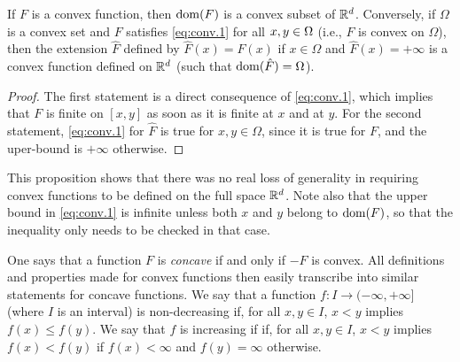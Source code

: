 \begin{proposition}
\label{prop:domain}
If $F$ is a convex function, then $\mathrm{dom}(F)$ is a convex subset of ${\mathbb{R}}^d$. Conversely, if $\Omega$ is a convex set and $F$ satisfies \eqref{eq:conv.1} for all $x,y\in \Omega$ (i.e., $F$ is convex on $\Omega$), then the extension $\hat F$ defined by $\hat F(x) = F(x)$ if $x\in \Omega$ and $\hat F(x) = +\infty$ is a convex function defined on ${\mathbb{R}}^d$ (such that $\mathrm{dom}(\hat F) = \Omega$).
\end{proposition}
\begin{proof} The first statement is a direct consequence of  \cref{eq:conv.1}, which implies that $F$ is finite on $[x,y]$ as soon as it is finite at $x$ and at $y$. For the second statement, \cref{eq:conv.1} for $\hat F$ is true for $x,y\in \Omega$, since it is true for $F$, and the uper-bound is $+\infty$ otherwise.
\end{proof}
This proposition shows that there was no real loss of generality in requiring convex functions to be defined on the full space ${\mathbb{R}}^d$. Note also that the upper bound in \cref{eq:conv.1} is infinite unless  both $x$ and $y$ belong to $\mathrm{dom}(F)$, so that the inequality only needs to be checked in that case.

One says that a function $F$ is {\em concave} if and only if $-F$ is convex. All definitions and properties made for convex functions then easily transcribe into similar statements for concave functions. We say that a function $f:I \to (-\infty, +\infty]$ (where $I$ is an interval) is non-decreasing if, for all $x,y\in I$, $x< y$ implies $f(x) \leq f(y)$. We say that $f$ is increasing if  if, for all $x,y\in I$, $x< y$ implies $f(x) < f(y)$ if $f(x) < \infty$ and $f(y) = \infty$ otherwise.



